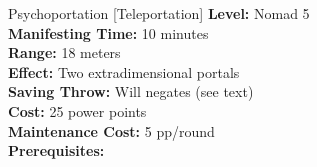 {Psychoportation [Teleportation]}
{
	\textbf{Level:}
	Nomad 5\\
	\textbf{Manifesting Time:}
	10 minutes\\
	\textbf{Range:}
	18 meters\\
	\textbf{Effect:}
	Two extradimensional portals\\
	\textbf{Saving Throw:}
	Will negates (see text)\\
	\textbf{Cost:}
	25 power points\\
	\textbf{Maintenance Cost:}
	5 pp/round\\
	\textbf{Prerequisites:}
	\\
}
